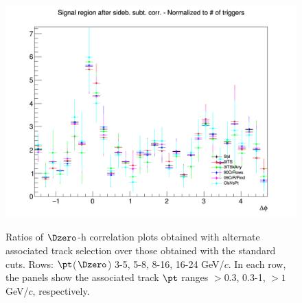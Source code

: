 \begin{figure}
{\includegraphics[width=0.31\linewidth]{figuresVsCent/Dzero/SystTrackEff/60_100/AzimCorrDistr_Dzero_Canvas_PtIntBins12to12_PoolInt_thr1to99_Superimp.png}} \\
 \caption{Ratios of $\Dzero$-h correlation plots obtained with alternate associated track selection over those obtained with the standard cuts. Rows: $\pt$($\Dzero$) 3-5, 5-8, 8-16, 16-24 GeV/$c$. In each row, the panels show the associated track
$\pt$ ranges $> 0.3$, 0.3-1, $> 1$ GeV/$c$, respectively.}
\label{fig:SysTrEff60100}
\end{figure}
